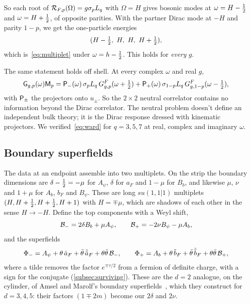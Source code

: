 So each root of $\mathcal{R}_{F,p}(\Omega)=g\sigma_pL_q$ with $\Omega=H$ gives bosonic modes at $\omega=H-\tfrac12$ and $\omega=H+\tfrac12$, of opposite parities. With the partner Dirac mode at $-H$ and parity $1-p$, we get the one-particle energies
\begin{equation}\label{eq:energies}
(H-\tfrac12,\ H,\ H,\ H+\tfrac12),
\end{equation}
which is~\eqref{eq:multiplet} under $\omega=h-\tfrac12$. This holds for \emph{every} $g$.

The same statement holds off shell. At every complex $\omega$ and real $g$,
\begin{equation}\label{eq:ward}
\mathsf{G}_{g,p}(\omega)\mathsf{M}_p=\mathsf{P}_-(\omega)\,\sigma_pL_q\,G^F_{g,p}(\omega+\tfrac12)+\mathsf{P}_+(\omega)\,\sigma_{1-p}L_q\,G^F_{g,1-p}(\omega-\tfrac12),
\end{equation}
with $\mathsf{P}_\pm$ the projectors onto $u_\pm$. So the $2\times2$ neutral correlator contains no information beyond the Dirac correlator. The neutral problem doesn't define an independent bulk theory; it is the Dirac response dressed with kinematic projectors. We verified~\eqref{eq:ward} for $q=3,5,7$ at real, complex and imaginary $\omega$.

\subsection{Boundary superfields}
\label{subsec:superfields}

The data at an endpoint assemble into two multiplets. On the strip the boundary dimensions are $\delta-\tfrac12=-\mu$ for $A_\psi$, $\delta$ for $a_F$ and $1-\mu$ for $B_b$, and likewise $\mu$, $\nu$ and $1+\mu$ for $A_b$, $b_F$ and $B_\psi$. These are long $su(1,1|1)$ multiplets $(H,H+\tfrac12,H+\tfrac12,H+1)$ with $H=\mp\mu$, which are shadows of each other in the sense $H\to-H$. Define the top components with a Weyl shift,
\begin{equation}\label{eq:tops}
\mathcal{B}_-=2\delta B_b+\mu A_\psi,\qquad\mathcal{B}_+=-2\nu B_\psi-\mu A_b,
\end{equation}
and the superfields
\begin{equation}\label{eq:superfields}
\Phi_-=A_\psi+\theta\,\tilde a_F+\bar\theta\,\tilde{\bar a}_F+\theta\bar\theta\,\mathcal{B}_-,\qquad\Phi_+=A_b+\theta\,\tilde b_F+\bar\theta\,\tilde{\bar b}_F+\theta\bar\theta\,\mathcal{B}_+,
\end{equation}
where a tilde removes the factor $e^{\mp\tau/2}$ from a fermion of definite charge, with a sign for the conjugate (\cref{subsec:surviving}). These are the $d=2$ analogue, on the cylinder, of Amsel and Marolf's boundary superfields~\cite[(3.24)]{Amsel:2008iz}, which they construct for $d=3,4,5$: their factors $(1\mp2m)$ become our $2\delta$ and $2\nu$.

